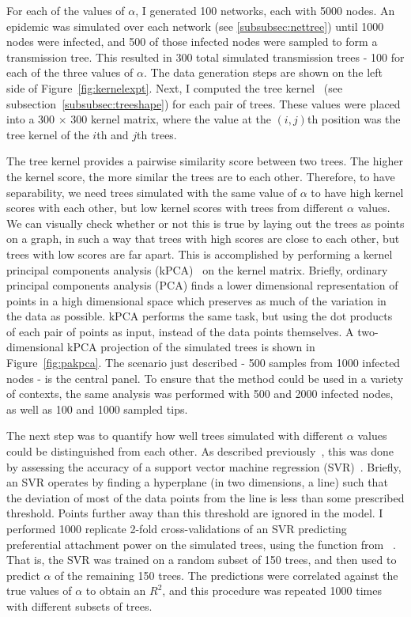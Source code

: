 For each of the values of $\alpha$, I generated 100 networks, each with 5000
nodes. An epidemic was simulated over each network (see
\cref{subsubsec:nettree}) until 1000 nodes were infected, and 500 of those
infected nodes were sampled to form a transmission tree. This resulted in 300
total simulated transmission trees - 100 for each of the three values of
$\alpha$. The data generation steps are shown on the left side of
Figure~\ref{fig:kernelexpt}. Next, I computed the tree
kernel~\autocite{poon2013mapping} (see subsection~\ref{subsubsec:treeshape})
for each pair of trees. These values were placed into a 300 $\times$ 300 kernel
matrix, where the value at the $(i, j)$th position was the tree kernel of the
$i$th and $j$th trees. 

The tree kernel provides a pairwise similarity score between two trees. The
higher the kernel score, the more similar the trees are to each other.
Therefore, to have separability, we need trees simulated with the same value of
$\alpha$ to have high kernel scores with each other, but low kernel scores with
trees from different $\alpha$ values. We can visually check whether or not this
is true by laying out the trees as points on a graph, in such a way that trees
with high scores are close to each other, but trees with low scores are far
apart. This is accomplished by performing a kernel principal components
analysis (kPCA)~\autocite{scholkopf1998nonlinear} on the kernel matrix.
Briefly, ordinary principal components analysis (PCA) finds a lower dimensional
representation of points in a high dimensional space which preserves as much of
the variation in the data as possible. kPCA performs the same task, but using
the dot products of each pair of points as input, instead of the data points
themselves. A two-dimensional kPCA projection of the simulated trees is shown
in Figure~\ref{fig:pakpca}. The scenario just described - 500 samples from 1000
infected nodes - is the central panel. To ensure that the method could be used
in a variety of contexts, the same analysis was performed with 500 and 2000
infected nodes, as well as 100 and 1000 sampled tips. 

The next step was to quantify how well trees simulated with different $\alpha$
values could be distinguished from each other. As described
previously~\autocite{poon2015phylodynamic}, this was done by assessing the
accuracy of a support vector machine regression
(SVR)~\autocite{smola1997support}. Briefly, an SVR operates by finding a
hyperplane (in two dimensions, a line) such that the deviation of most of the
data points from the line is less than some prescribed threshold. Points
further away than this threshold are ignored in the model. I performed 1000
replicate 2-fold cross-validations of an SVR predicting preferential attachment
power on the simulated trees, using the  function from
~\autocite{karatzoglou2004kernlab}. That is, the SVR was
trained on a random subset of 150 trees, and then used to predict $\alpha$ of
the remaining 150 trees. The predictions were correlated against the true
values of $\alpha$ to obtain an $R^2$, and this procedure was repeated 1000
times with different subsets of trees.

